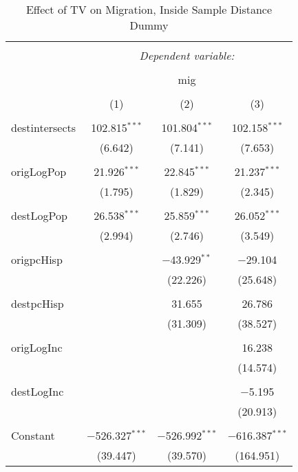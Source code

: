 
\begin{table}[!htbp] \centering 
  \caption{Effect of TV on Migration, Inside Sample Distance Dummy} 
  \label{} 
\begin{tabular}{@{\extracolsep{5pt}}lccc} 
\\[-1.8ex]\hline 
\hline \\[-1.8ex] 
 & \multicolumn{3}{c}{\textit{Dependent variable:}} \\ 
\cline{2-4} 
\\[-1.8ex] & \multicolumn{3}{c}{mig} \\ 
\\[-1.8ex] & (1) & (2) & (3)\\ 
\hline \\[-1.8ex] 
 destintersects & 102.815$^{***}$ & 101.804$^{***}$ & 102.158$^{***}$ \\ 
  & (6.642) & (7.141) & (7.653) \\ 
  & & & \\ 
 origLogPop & 21.926$^{***}$ & 22.845$^{***}$ & 21.237$^{***}$ \\ 
  & (1.795) & (1.829) & (2.345) \\ 
  & & & \\ 
 destLogPop & 26.538$^{***}$ & 25.859$^{***}$ & 26.052$^{***}$ \\ 
  & (2.994) & (2.746) & (3.549) \\ 
  & & & \\ 
 origpcHisp &  & $-$43.929$^{**}$ & $-$29.104 \\ 
  &  & (22.226) & (25.648) \\ 
  & & & \\ 
 destpcHisp &  & 31.655 & 26.786 \\ 
  &  & (31.309) & (38.527) \\ 
  & & & \\ 
 origLogInc &  &  & 16.238 \\ 
  &  &  & (14.574) \\ 
  & & & \\ 
 destLogInc &  &  & $-$5.195 \\ 
  &  &  & (20.913) \\ 
  & & & \\ 
 Constant & $-$526.327$^{***}$ & $-$526.992$^{***}$ & $-$616.387$^{***}$ \\ 
  & (39.447) & (39.570) & (164.951) \\ 

\end{tabular}
\end{table}
